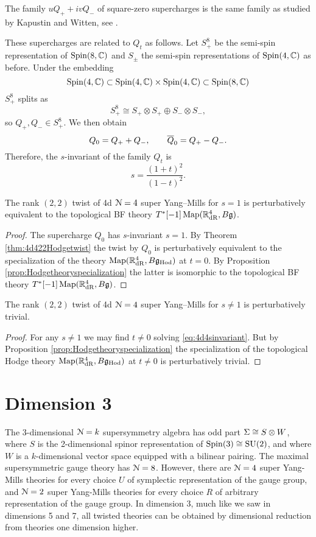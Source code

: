 \documentclass[10pt, oneside]{article}
\newcommand{\Hod}{\mathrm{Hod}}
\begin{document}
\begin{remark}
The family $uQ_+ + iv Q_-$ of square-zero supercharges is the same family as studied by Kapustin and Witten, see \cite[Section 3.1]{KapustinWitten}.
\end{remark}

These supercharges are related to $Q_t$ as follows. Let $S_+^8$ be the semi-spin representation of $\Spin(8, \CC)$ and $S_\pm$ the semi-spin representations of $\Spin(4, \CC)$ as before. Under the embedding
\[\Spin(4, \CC)\subset \Spin(4, \CC)\times \Spin(4, \CC)\subset \Spin(8, \CC)\]
$S_+^8$ splits as
\[S_+^8\cong S_+\otimes S_+\oplus S_-\otimes S_-,\]
so $Q_+, Q_-\in S_+^8$. We then obtain
\[Q_0 = Q_+ + Q_-,\qquad \Bar{Q}_0 = Q_+ - Q_-.\]
Therefore, the $s$-invariant of the family $Q_t$ is
\begin{equation}
s = \frac{(1+t)^2}{(1-t)^2}.
\label{eq:4d4sinvariant}
\end{equation}

\begin{cor}
The rank $(2, 2)$ twist of 4d $\cN=4$ super Yang--Mills for $s=1$ is perturbatively equivalent to the topological BF theory $T^*[-1]\map(\RR^4_{\mathrm{dR}}, B\fg)$.
\end{cor}
\begin{proof}
The supercharge $Q_0$ has $s$-invariant $s=1$. By Theorem \ref{thm:4d422Hodgetwist} the twist by $Q_0$ is perturbatively equivalent to the specialization of the theory $\map(\RR^4_{\mathrm{dR}}, B\fg_{\Hod})$ at $t=0$. By Proposition \ref{prop:Hodgetheoryspecialization} the latter is isomorphic to the topological BF theory $T^*[-1]\map(\RR^4_{\mathrm{dR}}, B\fg)$.
\end{proof}

\begin{cor}
The rank $(2, 2)$ twist of 4d $\cN=4$ super Yang--Mills for $s\neq 1$ is perturbatively trivial.
\end{cor}
\begin{proof}
For any $s\neq 1$ we may find $t\neq 0$ solving \eqref{eq:4d4sinvariant}. But by Proposition \ref{prop:Hodgetheoryspecialization} the specialization of the topological Hodge theory $\map(\RR^4_{\mathrm{dR}}, B\fg_{\Hod})$ at $t\neq 0$ is perturbatively trivial.
\end{proof}

\section{Dimension 3}
The 3-dimensional $\mc N=k$ supersymmetry algebra has odd part $\Sigma \iso S \otimes W$, where $S$ is the 2-dimensional spinor representation of $\Spin(3) \iso \SU(2)$, and where $W$ is a $k$-dimensional vector space equipped with a bilinear pairing.  The maximal supersymmetric gauge theory has $\mc N=8$.  However, there are $\mc N=4$ super Yang-Mills theories for every choice $U$ of symplectic representation of the gauge group, and $\mc N=2$ super Yang-Mills theories for every choice $R$ of arbitrary representation of the gauge group.  In dimension 3, much like we saw in dimensions 5 and 7, all twisted theories can be obtained by dimensional reduction from theories one dimension higher.
\end{document}
